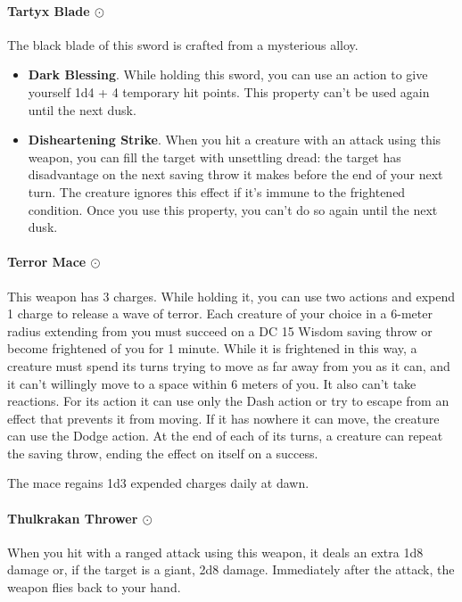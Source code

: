     \paragraph{Tartyx Blade $\odot$}
        The black blade of this sword is crafted from a mysterious alloy.
        \begin{itemize}
            \item \textbf{Dark Blessing}.
            While holding this sword, you can use an action to give yourself 1d4 + 4 temporary hit points.
            This property can't be used again until the next dusk.
            \item \textbf{Disheartening Strike}.
            When you hit a creature with an attack using this weapon, you can fill the target with unsettling dread: the target has disadvantage on the next saving throw it makes before the end of your next turn.
            The creature ignores this effect if it's immune to the frightened condition.
            Once you use this property, you can't do so again until the next dusk.
        \end{itemize}
    \paragraph{Terror Mace $\odot$}
        This weapon has 3 charges.
        While holding it, you can use two actions and expend 1 charge to release a wave of terror.
        Each creature of your choice in a 6-meter radius extending from you must succeed on a DC 15 Wisdom saving throw or become frightened of you for 1 minute.
        While it is frightened in this way, a creature must spend its turns trying to move as far away from you as it can, and it can't willingly move to a space within 6 meters of you.
        It also can't take reactions.
        For its action it can use only the Dash action or try to escape from an effect that prevents it from moving.
        If it has nowhere it can move, the creature can use the Dodge action.
        At the end of each of its turns, a creature can repeat the saving throw, ending the effect on itself on a success.

        The mace regains 1d3 expended charges daily at dawn.
    \paragraph{Thulkrakan Thrower $\odot$}
        When you hit with a ranged attack using this weapon, it deals an extra 1d8 damage or, if the target is a giant, 2d8 damage.
        Immediately after the attack, the weapon flies back to your hand.
